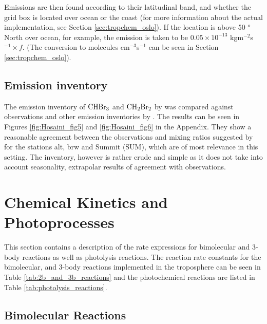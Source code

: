 Emissions are then found according to their latitudinal band, and whether the grid box is located over ocean or the coast (for more information about the actual implementation, see Section \ref{sec:tropchem_oslo}). If the location is above 50 $^o$ North over ocean, for example, the emission is taken to be $0.05\times10^{-13}$ kgm$^{-2}$s$^{-1}\times f$. (The conversion to molecules cm$^{-3}$s$^{-1}$ can be seen in Section \ref{sec:tropchem_oslo}). 


\subsection{Emission inventory}

The emission inventory of $\mathrm{CHBr_3}$ and $\mathrm{CH_2Br_2}$ by \cite{Liang2010} was compared against observations and other emission inventories by \cite{Hossaini2013}. The results can be seen in Figures \ref{fig:Hosaini_fig5} and \ref{fig:Hosaini_fig6} in the Appendix. They show a reasonable agreement between the observations and mixing ratios suggested by \cite{Liang2010} for the stations \acrfull{alt}, \acrfull{brw} and Summit (SUM), which are of most relevance in this setting. The inventory, however is rather crude and simple as it does not take into account seasonality, extrapolar results of agreement with observations. 





\section{Chemical Kinetics and Photoprocesses}\label{sec:chem_kinetics}

This section contains a description of the rate expressions for bimolecular and 3-body reactions as well as photolysis reactions. The reaction rate constants for the bimolecular, and 3-body reactions implemented in the troposphere can be seen in Table \ref{tab:2b_and_3b_reactions} and the photochemical reactions are listed in Table \ref{tab:photolysis_reactions}.






\subsection{Bimolecular Reactions}\label{sec:bimolecular_reactions}

